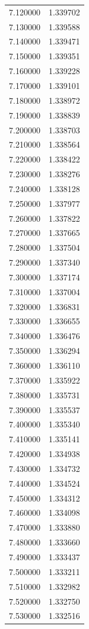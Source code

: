\begin{tabular}{rr}
7.120000 & 1.339702 \\
7.130000 & 1.339588 \\
7.140000 & 1.339471 \\
7.150000 & 1.339351 \\
7.160000 & 1.339228 \\
7.170000 & 1.339101 \\
7.180000 & 1.338972 \\
7.190000 & 1.338839 \\
7.200000 & 1.338703 \\
7.210000 & 1.338564 \\
7.220000 & 1.338422 \\
7.230000 & 1.338276 \\
7.240000 & 1.338128 \\
7.250000 & 1.337977 \\
7.260000 & 1.337822 \\
7.270000 & 1.337665 \\
7.280000 & 1.337504 \\
7.290000 & 1.337340 \\
7.300000 & 1.337174 \\
7.310000 & 1.337004 \\
7.320000 & 1.336831 \\
7.330000 & 1.336655 \\
7.340000 & 1.336476 \\
7.350000 & 1.336294 \\
7.360000 & 1.336110 \\
7.370000 & 1.335922 \\
7.380000 & 1.335731 \\
7.390000 & 1.335537 \\
7.400000 & 1.335340 \\
7.410000 & 1.335141 \\
7.420000 & 1.334938 \\
7.430000 & 1.334732 \\
7.440000 & 1.334524 \\
7.450000 & 1.334312 \\
7.460000 & 1.334098 \\
7.470000 & 1.333880 \\
7.480000 & 1.333660 \\
7.490000 & 1.333437 \\
7.500000 & 1.333211 \\
7.510000 & 1.332982 \\
7.520000 & 1.332750 \\
7.530000 & 1.332516 \\

\end{tabular}
